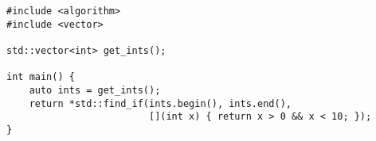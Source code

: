 \begin{lstlisting}[title=\href{https://godbolt.org/z/z6384d}{\texttt{godbolt.org/z/z6384d}}]
#include <algorithm>
#include <vector>

std::vector<int> get_ints();

int main() {
    auto ints = get_ints();
    return *std::find_if(ints.begin(), ints.end(),
                         [](int x) { return x > 0 && x < 10; });
}
\end{lstlisting}
